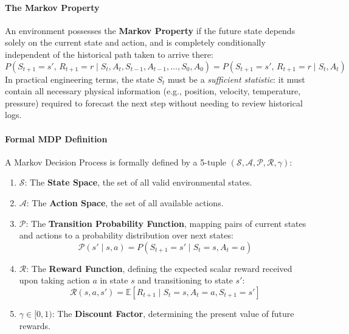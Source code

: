 \paragraph{The Markov Property}
An environment possesses the \textbf{Markov Property} if the future state depends solely on the current state and action, and is completely conditionally independent of the historical path taken to arrive there:
\begin{equation}
P(S_{t+1} = s',\, R_{t+1} = r \mid S_t, A_t, S_{t-1}, A_{t-1}, \dots, S_0, A_0) = P(S_{t+1} = s',\, R_{t+1} = r \mid S_t, A_t)\label{eq:markov_property}
\end{equation}
In practical engineering terms, the state $S_t$ must be a \emph{sufficient statistic}: it must contain all necessary physical information (e.g., position, velocity, temperature, pressure) required to forecast the next step without needing to review historical logs.

\paragraph{Formal MDP Definition}
A Markov Decision Process is formally defined by a 5-tuple $(\mathcal{S}, \mathcal{A}, \mathcal{P}, \mathcal{R}, \gamma)$:
\begin{enumerate}
    \item $\mathcal{S}$: The \textbf{State Space}, the set of all valid environmental states.
    \item $\mathcal{A}$: The \textbf{Action Space}, the set of all available actions.
    \item $\mathcal{P}$: The \textbf{Transition Probability Function}, mapping pairs of current states and actions to a probability distribution over next states:
    \begin{equation}
    \mathcal{P}(s' \mid s, a) = P(S_{t+1} = s' \mid S_t = s, A_t = a)\label{eq:transition_prob}
    \end{equation}
    \item $\mathcal{R}$: The \textbf{Reward Function}, defining the expected scalar reward received upon taking action $a$ in state $s$ and transitioning to state $s'$:
    \begin{equation}
    \mathcal{R}(s, a, s') = \mathbb{E}\left[ R_{t+1} \mid S_t = s, A_t = a, S_{t+1} = s' \right]\label{eq:reward_fn}
    \end{equation}
    \item $\gamma \in [0, 1)$: The \textbf{Discount Factor}, determining the present value of future rewards.
\end{enumerate}

